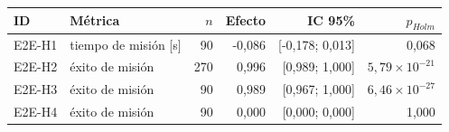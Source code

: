 \begin{tabular}{llrrrr}
\toprule
ID & Métrica & $n$ & Efecto & IC 95\% & $p_{Holm}$ \\
\midrule
E2E-H1 & tiempo de misión [s] & 90 & -0{,}086 & [-0{,}178; 0{,}013] & 0{,}068 \\
E2E-H2 & éxito de misión & 270 & 0{,}996 & [0{,}989; 1{,}000] & $5{,}79\times 10^{-21}$ \\
E2E-H3 & éxito de misión & 90 & 0{,}989 & [0{,}967; 1{,}000] & $6{,}46\times 10^{-27}$ \\
E2E-H4 & éxito de misión & 90 & 0{,}000 & [0{,}000; 0{,}000] & 1{,}000 \\
\bottomrule
\end{tabular}

